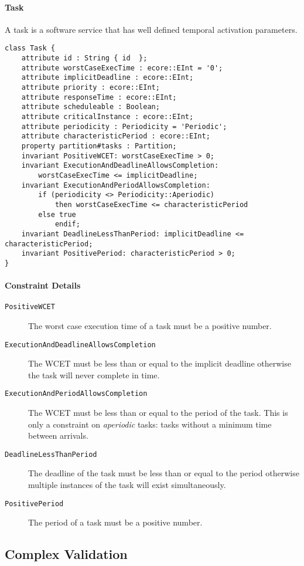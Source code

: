 \paragraph{Task}
A task is a software service that has well defined temporal activation parameters.
\begin{lstlisting}[caption=Task constraints]
class Task {
    attribute id : String { id  };
    attribute worstCaseExecTime : ecore::EInt = '0';
    attribute implicitDeadline : ecore::EInt;
    attribute priority : ecore::EInt;
    attribute responseTime : ecore::EInt;
    attribute scheduleable : Boolean;
    attribute criticalInstance : ecore::EInt;
    attribute periodicity : Periodicity = 'Periodic';
    attribute characteristicPeriod : ecore::EInt;
    property partition#tasks : Partition;
    invariant PositiveWCET: worstCaseExecTime > 0;
    invariant ExecutionAndDeadlineAllowsCompletion:
        worstCaseExecTime <= implicitDeadline;
    invariant ExecutionAndPeriodAllowsCompletion: 
        if (periodicity <> Periodicity::Aperiodic)
            then worstCaseExecTime <= characteristicPeriod
        else true
            endif;
    invariant DeadlineLessThanPeriod: implicitDeadline <= characteristicPeriod;
    invariant PositivePeriod: characteristicPeriod > 0;
}
\end{lstlisting}
\paragraph{Constraint Details} 
\begin{description}
    \item[\texttt{PositiveWCET}] The worst case execution time of a task must be a positive number.
    \item[\texttt{ExecutionAndDeadlineAllowsCompletion}] The WCET must be less than or equal to the implicit deadline otherwise the task will never complete in time.
    \item[\texttt{ExecutionAndPeriodAllowsCompletion}] The WCET must be less than or equal to the period of the task. This is only a constraint on \textit{aperiodic} tasks: tasks without a minimum time between arrivals.
    \item[\texttt{DeadlineLessThanPeriod}] The deadline of the task must be less than or equal to the period otherwise multiple instances of the task will exist simultaneously.
    \item[\texttt{PositivePeriod}] The period of a task must be a positive number.
\end{description}

\subsection{Complex Validation}
